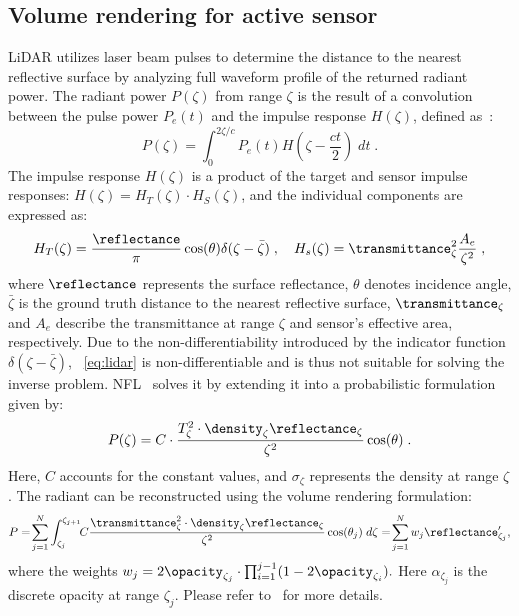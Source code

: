 \subsection{Volume rendering for active sensor} 
\label{sec:vol_render_background}
LiDAR utilizes laser beam pulses to determine the distance to the nearest reflective surface by analyzing full waveform profile of the returned radiant power. The radiant power $P(\zeta)$ from range $\zeta$ is the result of a convolution between the pulse power $P_e(t)$ and the impulse response $H(\zeta)$, defined as~\cite{hahner2021fog,hahner2022lidar,Huang2023nfl}:
\begin{equation}
    P(\zeta) = \int_0^{2\zeta/c} P_e(t) H(\zeta - \frac{ct}{2}) \; dt\;.
\label{eq:lidar}
\end{equation}
The impulse response $H(\zeta)$ is a product of the target and sensor impulse responses: $H(\zeta) = H_T(\zeta)\cdot H_S(\zeta)$, and the individual components are expressed as:
\begin{equation}
    H_T(\zeta) = \frac{\reflectance}{\pi} \cos(\theta) \delta(\zeta - \bar{\zeta})\;, \quad  H_s(\zeta) = \transmittance^2_{\zeta} \frac{A_e}{\zeta^2}\;,
\label{eq:ht}
\end{equation}
where $\reflectance$ represents the surface reflectance, $\theta$ denotes incidence angle, $\bar{\zeta}$ is the ground truth distance to the nearest reflective surface, $\transmittance_{\zeta}$ and $A_e$ describe the transmittance at range $\zeta$ and sensor's effective area, respectively. Due to the non-differentiability introduced by the indicator function $\delta(\zeta - \bar{\zeta})$, ~\cref{eq:lidar} is non-differentiable and is thus not suitable for solving the inverse problem. NFL~\cite{Huang2023nfl} solves it by extending it into a probabilistic formulation given by:
\begin{equation}
P(\zeta) = C \cdot \frac{T^2_{\zeta} \cdot \density_\zeta  \reflectance_\zeta}{\zeta^2} \cos(\theta)\;.
\label{eq:radiance}
\end{equation}
Here, $C$ accounts for the constant values, and $\sigma_\zeta$ represents the density at range $\zeta$. The radiant can be reconstructed using the volume rendering formulation:
\begin{equation}
      P
      =\!\sum_{j=1}^N \int_{\zeta_j}^{\zeta_{j+1}}\!\!C \frac{\transmittance^2_{\zeta} \cdot \density_\zeta \reflectance_\zeta}{\zeta^2} \cos(\theta_j) \; d\zeta
      =\!\sum_{j=1}^N w_j \reflectance_{\zeta_j}',
\label{eq:radiant_inter}
\end{equation}
where the weights $w_j = 2 \opacity_{\zeta_j} \cdot\prod_{i=1}^{j-1}(1 - 2 \opacity_{\zeta_i}).$
Here $\alpha_{\zeta_j}$ is the discrete opacity at range $\zeta_j$. Please refer to~\cite{Huang2023nfl} for more details.


